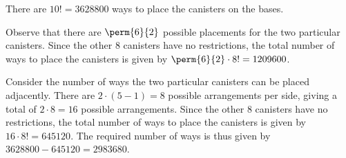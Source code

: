 \begin{solution}
    There are $10! = 3628800$ ways to place the canisters on the bases.

    \begin{ppart}
        Observe that there are $\perm{6}{2}$ possible placements for the two particular canisters. Since the other 8 canisters have no restrictions, the total number of ways to place the canisters is given by $\perm{6}{2} \cdot 8! = 1209600$.
    \end{ppart}
    \begin{ppart}
        Consider the number of ways the two particular canisters can be placed adjacently. There are $2 \cdot (5-1) = 8$ possible arrangements per side, giving a total of $2 \cdot 8 = 16$ possible arrangements. Since the other 8 canisters have no restrictions, the total number of ways to place the canisters is given by $16 \cdot 8! = 645120$. The required number of ways is thus given by $3628800 - 645120 = 2983680$.
    \end{ppart}
\end{solution}